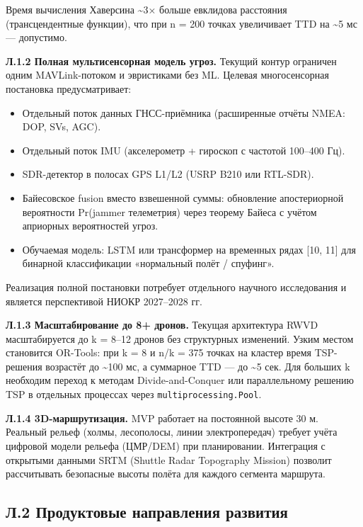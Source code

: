 \documentclass[14pt,a4paper]{extarticle}
\providecommand{\tightlist}{%
  \setlength{\itemsep}{0pt}\setlength{\parskip}{0pt}}
\begin{document}
Время вычисления Хаверсина \textasciitilde3× больше евклидова расстояния (трансцендентные функции), что при n = 200 точках увеличивает TTD на \textasciitilde5 мс --- допустимо.

\textbf{Л.1.2 Полная мультисенсорная модель угроз.} Текущий контур ограничен одним MAVLink-потоком и эвристиками без ML. Целевая многосенсорная постановка предусматривает:

\begin{itemize}
\tightlist
\item
  Отдельный поток данных ГНСС-приёмника (расширенные отчёты NMEA: DOP, SVs, AGC).
\item
  Отдельный поток IMU (акселерометр + гироскоп с частотой 100--400 Гц).
\item
  SDR-детектор в полосах GPS L1/L2 (USRP B210 или RTL-SDR).
\item
  Байесовское fusion вместо взвешенной суммы: обновление апостериорной вероятности Pr(jammer \textbar{} телеметрия) через теорему Байеса с учётом априорных вероятностей угроз.
\item
  Обучаемая модель: LSTM или трансформер на временных рядах {[}10, 11{]} для бинарной классификации «нормальный полёт / спуфинг».
\end{itemize}

Реализация полной постановки потребует отдельного научного исследования и является перспективой НИОКР 2027--2028 гг.

\textbf{Л.1.3 Масштабирование до 8+ дронов.} Текущая архитектура RWVD масштабируется до k = 8--12 дронов без структурных изменений. Узким местом становится OR-Tools: при k = 8 и n/k = 375 точках на кластер время TSP-решения возрастёт до \textasciitilde100 мс, а суммарное TTD --- до \textasciitilde5 сек. Для больших k необходим переход к методам Divide-and-Conquer или параллельному решению TSP в отдельных процессах через \texttt{multiprocessing.Pool}.

\textbf{Л.1.4 3D-маршрутизация.} MVP работает на постоянной высоте 30 м. Реальный рельеф (холмы, лесополосы, линии электропередач) требует учёта цифровой модели рельефа (ЦМР/DEM) при планировании. Интеграция с открытыми данными SRTM (Shuttle Radar Topography Mission) позволит рассчитывать безопасные высоты полёта для каждого сегмента маршрута.

\hypertarget{ux43b.2-ux43fux440ux43eux434ux443ux43aux442ux43eux432ux44bux435-ux43dux430ux43fux440ux430ux432ux43bux435ux43dux438ux44f-ux440ux430ux437ux432ux438ux442ux438ux44f}{%
\subsection{Л.2 Продуктовые направления развития}\label{ux43b.2-ux43fux440ux43eux434ux443ux43aux442ux43eux432ux44bux435-ux43dux430ux43fux440ux430ux432ux43bux435ux43dux438ux44f-ux440ux430ux437ux432ux438ux442ux438ux44f}}
\end{document}
